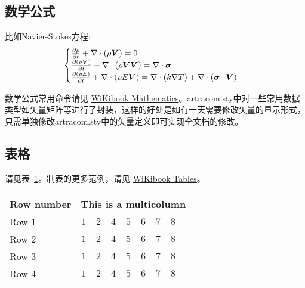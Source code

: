 \subsection{数学公式}

比如Navier-Stokes方程:
\begin{equation} \label{eq:ns}
    \begin{cases}
        \frac{\partial \rho}{\partial t} + \nabla\cdot(\rho\boldsymbol{V}) = 0 \\
        \frac{\partial (\rho\boldsymbol{V})}{\partial t} + \nabla\cdot(\rho\boldsymbol{V}\boldsymbol{V}) = \nabla\cdot\boldsymbol{\mathsf{\sigma}}\\
        \frac{\partial (\rho E)}{\partial t} + \nabla\cdot(\rho E\boldsymbol{V}) = \nabla\cdot(k\nabla T) + \nabla\cdot(\boldsymbol{\mathsf{\sigma}}\cdot\boldsymbol{V})
    \end{cases}
\end{equation}

数学公式常用命令请见 \href{https://en.wikibooks.org/wiki/LaTeX/Mathematics}{WiKibook Mathematics}。artracom.sty中对一些常用数据类型如矢量矩阵等进行了封装，这样的好处是如有一天需要修改矢量的显示形式，只需单独修改artracom.sty中的矢量定义即可实现全文档的修改。

\subsection{表格}

请见表~\ref{tab:sample}。制表的更多范例，请见 \href{https://en.wikibooks.org/wiki/LaTeX/Tables}{WiKibook Tables}。
\begin{table}[!htbp]
    \label{tab:sample}
    \centering
    \footnotesize%
    \setlength{\tabcolsep}{4pt}%
    \renewcommand{\arraystretch}{1.2}%
    \begin{tabular}{lcccccccc}
        \hline
        Row number & \multicolumn{8}{c}{This is a multicolumn} \\
        \hline
        Row 1 & $1$ & $2$ & $4$ & $5$ & $6$ & $7$ & $8$\\
        Row 2 & $1$ & $2$ & $4$ & $5$ & $6$ & $7$ & $8$\\
        Row 3 & $1$ & $2$ & $4$ & $5$ & $6$ & $7$ & $8$\\
        Row 4 & $1$ & $2$ & $4$ & $5$ & $6$ & $7$ & $8$\\
        \hline
    \end{tabular}
\end{table}


